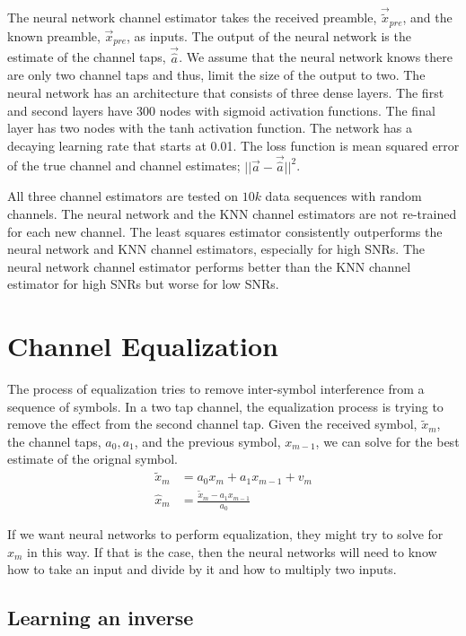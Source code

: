 The neural network channel estimator takes the received preamble, $\vec{\tilde{x}}_{pre}$, and the known preamble, $\vec{x}_{pre}$, as inputs.
The output of the neural network is the estimate of the channel taps, $\vec{\hat{a}}$.  We assume that the neural network knows there are only two channel taps and thus, limit the size of the output to two.
The neural network has an architecture that consists of three dense layers.  
The first and second layers have $300$ nodes with sigmoid activation functions.  The final layer has two nodes with the tanh activation function.  The network has a decaying learning rate that starts at 0.01. 
The loss function is mean squared error of the true channel and channel estimates; $||\vec{a}-\vec{\hat{a}}||^2$.

All three channel estimators are tested on $10k$ data sequences with random channels.  The neural network and the KNN channel estimators are not re-trained for each new channel.  The least squares estimator consistently outperforms the neural network and KNN channel estimators, especially for high SNRs.
The neural network channel estimator performs better than the KNN channel estimator for high SNRs but worse for low SNRs.


\section{Channel Equalization}

The process of equalization tries to remove inter-symbol interference from a sequence of symbols.  
In a two tap channel, the equalization process is trying to remove the effect from the second channel tap.  Given the received symbol, $\tilde{x}_m$, the channel taps, $a_0, a_1$, and the previous symbol, $x_{m-1}$, we can solve for the best estimate of the orignal symbol.
\begin{align}
\tilde{x}_m &= a_0 x_{m} + a_1 x_{m-1} + v_m\\
\hat{x}_m &= \frac{\tilde{x}_m - a_1 x_{m-1}}{a_0}
\end{align}

If we want neural networks to perform equalization, they might try to solve for $\hat{x}_m$ in this way.  
If that is the case, then the neural networks will need to know how to take an input and divide by it and how to multiply two inputs.  

\subsection{Learning an inverse}

